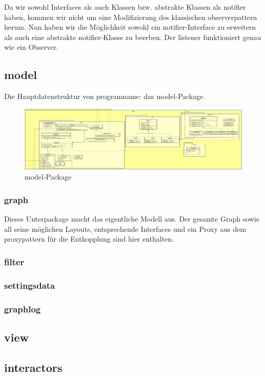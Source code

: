 Da wir sowohl Interfaces als auch Klassen bzw. abstrakte Klassen als
\gls{notifier} haben, kommen wir nicht um eine Modifizierung des klassischen
\gls{observerpattern} herum. Nun haben wir die Möglichkeit sowohl ein
\gls{notifier}-Interface zu erweitern als auch eine abstrakte
\gls{notifier}-Klasse zu beerben. Der \gls{listener} funktioniert genau wie ein
Observer.


\subsection{model}


Die Hauptdatenstruktur von \gls{programname}: das model-Package.

\begin{figure}[H]
  \centering
  \includegraphics[width=\textwidth]{../diagramimages/model.png}
  \caption{model-Package}
\end{figure}

    \subsubsection{graph}
    Dieses Unterpackage macht das eigentliche Modell aus. Der gesamte Graph sowie all seine möglichen Layouts, entsprechende Interfaces und ein Proxy aus dem \gls{proxypattern} für die Entkopplung sind hier enthalten.
    \subsubsection{filter}

    \subsubsection{settingsdata}

    \subsubsection{graphlog}


\subsection{view}

\subsection{interactors}
